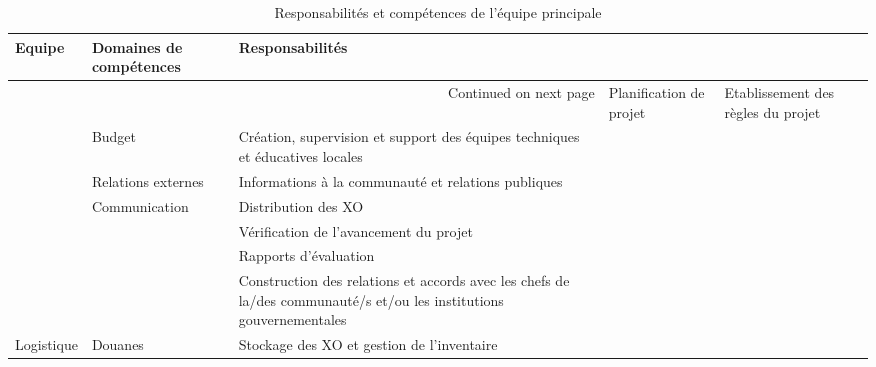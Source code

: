 \documentclass[11pt]{article}
\begin{document}
\begin{longtable}{|p{2cm}|p{5cm}|p{8cm}|}
\caption{Responsabilités et compétences de l'équipe principale} \\
\hline
 Equipe                     &  Domaines de compétences                                      &  Responsabilités                                                                                                                \\
\hline
\endhead
\hline\multicolumn{3}{r}{Continued on next page}\
\endfoot
\endlastfoot
\hline
 Direction du projet        &  Planification de projet                                      &  Etablissement des règles du projet                                                                                              \\
                            &  Budget                                                       &  Création, supervision et support des équipes techniques et éducatives locales                                                   \\
                            &  Relations externes                                           &  Informations à la communauté et relations publiques                                                                             \\
                            &  Communication                                                &  Distribution des XO                                                                                                             \\
                            &                                                               &  Vérification de l’avancement du projet                                                                                          \\
                            &                                                               &  Rapports d’évaluation                                                                                                           \\
                            &                                                               &  Construction des relations et accords avec les chefs de la/des communauté/s et/ou les institutions gouvernementales             \\
\hline
 Logistique                 &  Douanes                                                      &  Stockage des XO et gestion de l’inventaire                                                                                      \\

\end{longtable}
\end{document}
